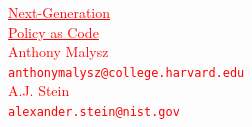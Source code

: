 \documentclass[11pt]{article}
\begin{document}
\begin{center}
    \textcolor{red}{
    \HUGE \underline{Next-Generation} \\
    \HUGE \underline{Policy as Code} \large \\
    \vspace{2em}
    Anthony \hspace{0.2cm}Malysz \\
    \texttt{anthonymalysz@college.harvard.edu} \\
    \vspace{1em}
    A.J. \hspace{0.2cm}Stein \\
    \texttt{alexander.stein@nist.gov} \\
    \vspace{1em}
    }
\end{center}
\end{document}
